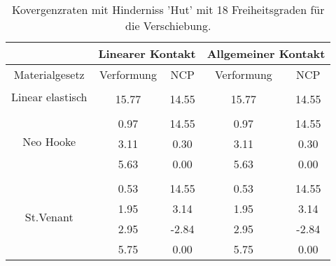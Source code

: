 \begin{table} 
\centering 
\begin{tabular}{c|cc|cc|} 
\cline{2-5} 
 & \multicolumn{2}{|c|}{Linearer Kontakt} & \multicolumn{2}{|c|}{Allgemeiner Kontakt} \\ 
\hline 
\multicolumn{1}{|c|}{Materialgesetz} & \multicolumn{1}{c|}{Verformung} & \multicolumn{1}{c|}{NCP} & \multicolumn{1}{c|}{Verformung} & \multicolumn{1}{c|}{NCP} \\ 
\hline 
\multicolumn{1}{|c|}{\multirow{2}{*}{Linear elastisch}} &\multicolumn{1}{|c|}{} & \multicolumn{1}{|c|}{} & \multicolumn{1}{|c|}{} & \multicolumn{1}{|c|}{} \\ 
\multicolumn{1}{|c|}{} & \multicolumn{1}{|c|}{     15.77} & \multicolumn{1}{|c|}{     14.55} & \multicolumn{1}{|c|}{     15.77} & \multicolumn{1}{|c|}{     14.55} \\ 
\hline 
\multicolumn{1}{|c|}{\multirow{4}{*}{Neo Hooke}} &\multicolumn{1}{|c|}{} & \multicolumn{1}{|c|}{} & \multicolumn{1}{|c|}{} & \multicolumn{1}{|c|}{} \\ 
\multicolumn{1}{|c|}{} & \multicolumn{1}{|c|}{      0.97} & \multicolumn{1}{|c|}{     14.55} & \multicolumn{1}{|c|}{      0.97} & \multicolumn{1}{|c|}{     14.55} \\ 
\multicolumn{1}{|c|}{} & \multicolumn{1}{|c|}{      3.11} & \multicolumn{1}{|c|}{      0.30} & \multicolumn{1}{|c|}{      3.11} & \multicolumn{1}{|c|}{      0.30} \\ 
\multicolumn{1}{|c|}{} & \multicolumn{1}{|c|}{      5.63} & \multicolumn{1}{|c|}{      0.00} & \multicolumn{1}{|c|}{      5.63} & \multicolumn{1}{|c|}{      0.00} \\ 
\hline 
\multicolumn{1}{|c|}{\multirow{5}{*}{St.Venant}} &\multicolumn{1}{|c|}{} & \multicolumn{1}{|c|}{} & \multicolumn{1}{|c|}{} & \multicolumn{1}{|c|}{} \\ 
\multicolumn{1}{|c|}{} & \multicolumn{1}{|c|}{      0.53} & \multicolumn{1}{|c|}{     14.55} & \multicolumn{1}{|c|}{      0.53} & \multicolumn{1}{|c|}{     14.55} \\ 
\multicolumn{1}{|c|}{} & \multicolumn{1}{|c|}{      1.95} & \multicolumn{1}{|c|}{      3.14} & \multicolumn{1}{|c|}{      1.95} & \multicolumn{1}{|c|}{      3.14} \\ 
\multicolumn{1}{|c|}{} & \multicolumn{1}{|c|}{      2.95} & \multicolumn{1}{|c|}{     -2.84} & \multicolumn{1}{|c|}{      2.95} & \multicolumn{1}{|c|}{     -2.84} \\ 
\multicolumn{1}{|c|}{} & \multicolumn{1}{|c|}{      5.75} & \multicolumn{1}{|c|}{      0.00} & \multicolumn{1}{|c|}{      5.75} & \multicolumn{1}{|c|}{      0.00} \\ 
\hline 
\end{tabular}\caption{Kovergenzraten mit Hinderniss 'Hut' mit 18 Freiheitsgraden für die Verschiebung.}\label{tab:Rate_Hut_level0}
\end{table} 
